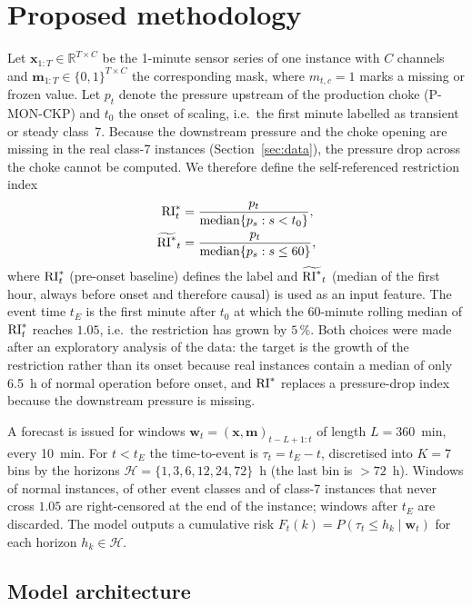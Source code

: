 \section{Proposed methodology}\label{sec:method}

Let $\mathbf{x}_{1:T}\in\mathbb{R}^{T\times C}$ be the 1-minute sensor series of one instance with $C$
channels and $\mathbf{m}_{1:T}\in\{0,1\}^{T\times C}$ the corresponding mask, where $m_{t,c}=1$ marks a
missing or frozen value. Let $p_t$ denote the pressure upstream of the production choke (P-MON-CKP) and
$t_0$ the onset of scaling, i.e.\ the first minute labelled as transient or steady class~7. Because the
downstream pressure and the choke opening are missing in the real class-7 instances
(Section~\ref{sec:data}), the pressure drop across the choke cannot be computed. We therefore define the
self-referenced restriction index
\begin{align}
\mathrm{RI}^{*}_t&=\frac{p_t}{\operatorname{median}\{p_s : s<t_0\}},\label{eq:ri}\\
\widetilde{\mathrm{RI}^{*}}_t&=\frac{p_t}{\operatorname{median}\{p_s : s\le 60\}},\nonumber
\end{align}
where $\mathrm{RI}^{*}_t$ (pre-onset baseline) defines the label and $\widetilde{\mathrm{RI}^{*}}_t$ (median of the first hour,
always before onset and therefore causal) is used as an input feature. The event time $t_E$ is the first
minute after $t_0$ at which the 60-minute rolling median of $\mathrm{RI}^{*}_t$ reaches $1.05$, i.e.\ the restriction
has grown by $5\,\%$. Both choices were made after an exploratory analysis of the data: the target is the
growth of the restriction rather than its onset because real instances contain a median of only 6.5~h of
normal operation before onset, and $\mathrm{RI}^{*}$ replaces a pressure-drop index because the downstream pressure is
missing.

A forecast is issued for windows $\mathbf{w}_t=(\mathbf{x},\mathbf{m})_{t-L+1:t}$ of length $L=360$~min,
every 10~min. For $t<t_E$ the time-to-event is $\tau_t=t_E-t$, discretised into $K=7$ bins by the
horizons $\mathcal{H}=\{1,3,6,12,24,72\}$~h (the last bin is $>72$~h). Windows of normal instances, of
other event classes and of class-7 instances that never cross $1.05$ are right-censored at the end of the
instance; windows after $t_E$ are discarded. The model outputs a cumulative risk
$F_t(k)=P(\tau_t\le h_k\mid \mathbf{w}_t)$ for each horizon $h_k\in\mathcal{H}$.

\subsection{Model architecture}


